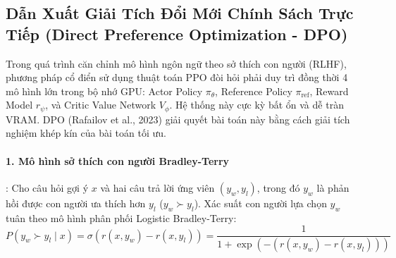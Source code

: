 \subsection{Dẫn Xuất Giải Tích Đổi Mới Chính Sách Trực Tiếp (Direct Preference Optimization - DPO)}
Trong quá trình căn chỉnh mô hình ngôn ngữ theo sở thích con người (RLHF), phương pháp cổ điển sử dụng thuật toán PPO đòi hỏi phải duy trì đồng thời 4 mô hình lớn trong bộ nhớ GPU: Actor Policy $\pi_\theta$, Reference Policy $\pi_{\text{ref}}$, Reward Model $r_\psi$, và Critic Value Network $V_\phi$. Hệ thống này cực kỳ bất ổn và dễ tràn VRAM.
DPO (Rafailov et al., 2023) giải quyết bài toán này bằng cách giải tích nghiệm khép kín của bài toán tối ưu.

\paragraph{1. Mô hình sở thích con người Bradley-Terry}:
Cho câu hỏi gợi ý $x$ và hai câu trả lời ứng viên $(y_w, y_l)$, trong đó $y_w$ là phản hồi được con người ưa thích hơn $y_l$ ($y_w \succ y_l$). Xác suất con người lựa chọn $y_w$ tuân theo mô hình phân phối Logistic Bradley-Terry:
\begin{equation}
P(y_w \succ y_l \mid x) = \sigma\left( r(x, y_w) - r(x, y_l) \right) = \frac{1}{1 + \exp\left( - (r(x, y_w) - r(x, y_l)) \right)}
\end{equation}

